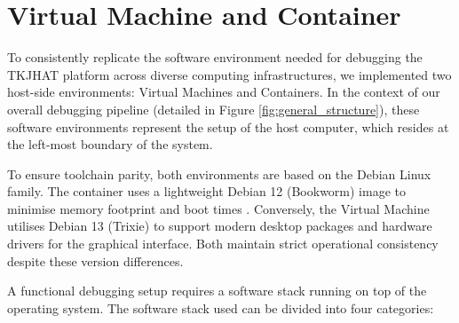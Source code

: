 \section{Virtual Machine and Container}
To consistently replicate the software environment needed for debugging the TKJHAT platform across diverse computing infrastructures, we implemented two host-side environments: Virtual Machines and Containers. In the context of our overall debugging pipeline (detailed in Figure \ref{fig:general_structure}), these software environments represent the setup of the host computer, which resides at the left-most boundary of the system.

To ensure toolchain parity, both environments are based on the Debian Linux family. The container uses a lightweight Debian 12 (Bookworm) image to minimise memory footprint and boot times \cite{rosen_namespaces_slides}. Conversely, the Virtual Machine utilises Debian 13 (Trixie) to support modern desktop packages and hardware drivers for the graphical interface. Both maintain strict operational consistency despite these version differences.

A functional debugging setup requires a software stack running on top of the operating system. The software stack used can be divided into four categories:


